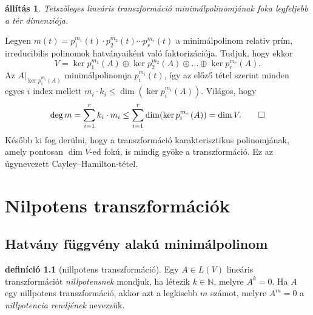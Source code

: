 \documentclass[9pt, a4paper, showtrims]{memoir}
\makeatletter
\renewenvironment{proof}[1][\proofname]
    {\par\pushQED{\qed}%
    \normalfont \topsep6\p@\@plus6\p@\relax
    \trivlist
    \item[\hskip\labelsep
        \itshape
    #1\@addpunct{:}]\ignorespaces}
    {\popQED\endtrivlist\@endpefalse}
\theoremstyle{plain}
\newtheorem{proposition}{állítás}[chapter]
\theoremstyle{remark}
\theoremstyle{definition}
\newtheorem{definition}[proposition]{definíció}
\makeatother
\begin{document}
    \begin{proposition}
        Tetszőleges lineáris transzformáció minimálpolinomjának foka legfeljebb a tér dimenziója.
        \label{th:minpol}
    \end{proposition}
    \begin{proof}
        Legyen 
        $
        m\left( t \right)
        =
        p_1^{m_1}\left( t \right)\cdot
        p_2^{m_2}\left( t \right)\cdots
        p_r^{m_r}\left( t \right)
        $
        a minimálpolinom relativ prím, irreducibilis polinomok hatványaiként való faktorizációja.
        Tudjuk, hogy ekkor 
        \[
            V
            =
            \ker p_1^{m_1}\left( A \right)
            \oplus
            \ker p_2^{m_2}\left( A \right)
            \oplus\dots\oplus
            \ker p_r^{m_r}\left( A \right).
        \]
        Az $A|_{\ker p_i^{m_i}\left( A \right)}$ minimálpolinomja $p_i^{m_i}\left( t \right)$, így az előző tétel szerint minden egyes $i$ index mellett
        $
        m_i\cdot k_i\leq \dim(\ker p_i^{m_i}\left( A \right)).
        $
        Világos, hogy
        \[
            \deg m
            =
            \sum_{i=1}^rk_i\cdot m_i
            \leq
            \sum_{i=1}^r\dim(\ker p_i^{m_i}\left( A \right))
            =
            \dim V.\qedhere
        \]
    \end{proof}
    Később ki fog derülni,
    hogy a transzformáció karakterisztikus polinomjának, amely pontosan $\dim V$-ed fokú,
    is mindig gyöke a transzformáció.
    Ez az úgynevezett Cayley--Hamilton-tétel.
\chapter{Nilpotens transzformációk}
\section{Hatvány függvény alakú minimálpolinom}
\begin{definition}[nillpotens transzformáció]
    Egy $A\in L\left( V \right)$ lineáris transzformációt 
    \emph{nillpotensnek} mondjuk, ha
    létezik $k\in\mathbb{N}$, melyre $A^k=0$.
    Ha $A$ egy nillpotens transzformáció, akkor azt a legkisebb $m$ számot, melyre $A^m=0$ a \emph{nillpotencia rendjének} nevezzük.
\end{definition}
\end{document}
